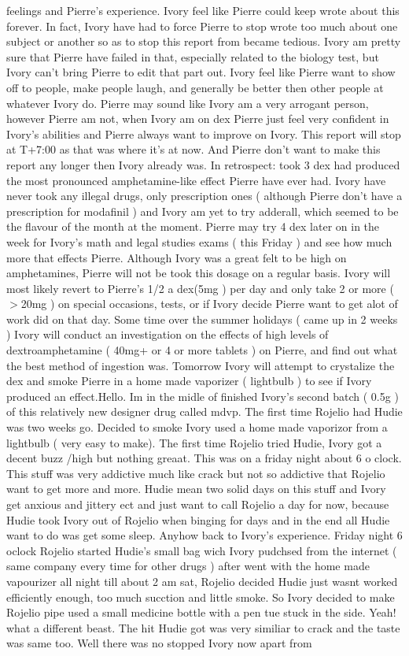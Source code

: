 \documentclass[12pt]{book}
\begin{document}
feelings and Pierre's experience. Ivory feel like Pierre could keep wrote about this forever. In fact, Ivory have had to force Pierre to stop wrote too much about one subject or another so as to stop this report from became tedious. Ivory am pretty sure that Pierre have failed in that, especially related to the biology test, but Ivory can't bring Pierre to edit that part out. Ivory feel like Pierre want to show off to people, make people laugh, and generally be better then other people at whatever Ivory do. Pierre may sound like Ivory am a very arrogant person, however Pierre am not, when Ivory am on dex Pierre just feel very confident in Ivory's abilities and Pierre always want to improve on Ivory. This report will stop at T+7:00 as that was where it's at now. And Pierre don't want to make this report any longer then Ivory already was. In retrospect: took 3 dex had produced the most pronounced amphetamine-like effect Pierre have ever had. Ivory have never took any illegal drugs, only prescription ones ( although Pierre don't have a prescription for modafinil ) and Ivory am yet to try adderall, which seemed to be the flavour of the month at the moment. Pierre may try 4 dex later on in the week for Ivory's math and legal studies exams ( this Friday ) and see how much more that effects Pierre. Although Ivory was a great felt to be high on amphetamines, Pierre will not be took this dosage on a regular basis. Ivory will most likely revert to Pierre's 1/2 a dex(5mg ) per day and only take 2 or more ( $>$20mg ) on special occasions, tests, or if Ivory decide Pierre want to get alot of work did on that day. Some time over the summer holidays ( came up in 2 weeks ) Ivory will conduct an investigation on the effects of high levels of dextroamphetamine ( 40mg+ or 4 or more tablets ) on Pierre, and find out what the best method of ingestion was. Tomorrow Ivory will attempt to crystalize the dex and smoke Pierre in a home made vaporizer ( lightbulb ) to see if Ivory produced an effect.Hello. Im in the midle of finished Ivory's second batch ( 0.5g ) of this relatively new designer drug called mdvp. The first time Rojelio had Hudie was two weeks go. Decided to smoke Ivory used a home made vaporizor from a lightbulb ( very easy to make). The first time Rojelio tried Hudie, Ivory got a decent buzz /high but nothing greaat. This was on a friday night about 6 o clock. This stuff was very addictive much like crack but not so addictive that Rojelio want to get more and more. Hudie mean two solid days on this stuff and Ivory get anxious and jittery ect and just want to call Rojelio a day for now, because Hudie took Ivory out of Rojelio when binging for days and in the end all Hudie want to do was get some sleep. Anyhow back to Ivory's experience. Friday night 6 oclock Rojelio started Hudie's small bag wich Ivory pudchsed from the internet ( same company every time for other drugs ) after went with the home made vapourizer all night till about 2 am sat, Rojelio decided Hudie just wasnt worked efficiently enough, too much sucction and little smoke. So Ivory decided to make Rojelio pipe used a small medicine bottle with a pen tue stuck in the side. Yeah! what a different beast. The hit Hudie got was very similiar to crack and the taste was same too. Well there was no stopped Ivory now apart from 
\end{document}

